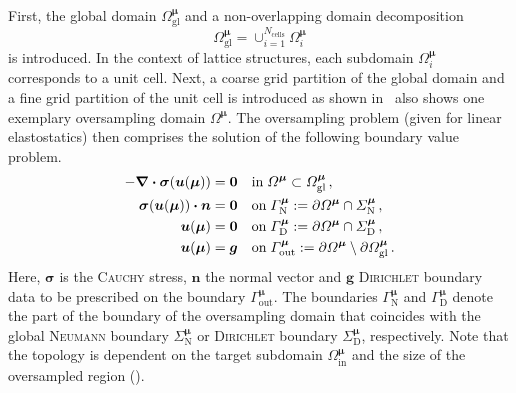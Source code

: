 \documentclass[a4paper]{eccomas_paper-2024}
\newcommand{\m}{\bm\mu}
\newcommand{\out}{\mathrm{out}}
\newcommand{\inrm}{\mathrm{in}}
\begin{document}

First, the global domain $\varOmega_{\mathrm{gl}}^{\bm\mu}$ and a non-overlapping domain decomposition
\begin{equation}
	\varOmega_{\mathrm{gl}}^{\bm\mu}=\cup_{i=1}^{N_{\mathrm{cells}}} \varOmega_i^{\bm\mu}
\end{equation}
is introduced.
In the context of lattice structures, each subdomain $\varOmega_i^{\bm\mu}$ corresponds to a unit cell.
Next, a coarse grid partition of the global domain and a fine grid partition of the unit cell is introduced as shown in~
 also shows one exemplary oversampling domain $\varOmega^{\bm\mu}$.
The oversampling problem (given for linear elastostatics) then comprises the solution of the following boundary value problem.
\begin{align}
	\begin{split}
	\label{eq:osp_p}
    - \div{\bm{\sigma}} (\bm{u}(\bm\mu)) &= \bm{0} \quad  \mathrm{in}\;{\varOmega^{\bm\mu}}\subset\varOmega^{\bm\mu}_{\mathrm{gl}}\,,\\
    \bm{\sigma}(\bm{u}(\bm\mu)) \vdot \bm{n} &= \bm{0} \quad \mathrm{on}\; \varGamma^{\m}_{\mathrm{N}}:= \partial\varOmega^{\m}\cap\varSigma^{\m}_{\mathrm{N}}\,,\\
    \bm{u}(\bm\mu) &= \bm{0} \quad  \mathrm{on}\;\varGamma^{\m}_{\mathrm{D}}:=\partial\varOmega^{\m}\cap\varSigma^{\m}_{\mathrm{D}}\,,\\
    \bm{u}(\bm\mu) &= \bm{g}\quad\mathrm{on}\;\varGamma^{\m}_{\mathrm{out}}:= \partial\varOmega^{\m} \setminus\partial\varOmega^{\m}_{\mathrm{gl}}\,.
	\end{split}
\end{align}
Here, $\bm\sigma$ is the \textsc{Cauchy} stress, $\bm{n}$ the normal vector and $\bm{g}$ \textsc{Dirichlet} boundary data to be prescribed on the boundary $\varGamma^{\m}_{\out}$.
The boundaries $\varGamma^{\m}_{\mathrm{N}}$ and $\varGamma^{\m}_{\mathrm{D}}$ denote the part of the boundary of the oversampling domain that coincides with the global \textsc{Neumann} boundary $\varSigma^{\m}_{\mathrm{N}}$ or \textsc{Dirichlet} boundary $\varSigma^{\m}_{\mathrm{D}}$, respectively.
Note that the topology is dependent on the target subdomain $\varOmega^{\m}_{\inrm}$ and the size of the oversampled region ().
\end{document}
